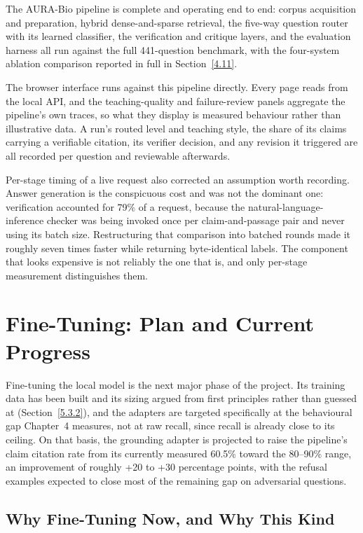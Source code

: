The AURA-Bio pipeline is complete and operating end to end: corpus
acquisition and preparation, hybrid dense-and-sparse retrieval, the
five-way question router with its learned classifier, the verification and
critique layers, and the evaluation harness all run against the full
441-question benchmark, with the four-system ablation comparison reported
in full in Section~\ref{4.11}.

The browser interface runs against this pipeline directly. Every page reads
from the local API, and the teaching-quality and failure-review panels
aggregate the pipeline's own traces, so what they display is measured
behaviour rather than illustrative data. A run's routed level and teaching
style, the share of its claims carrying a verifiable citation, its verifier
decision, and any revision it triggered are all recorded per question and
reviewable afterwards.

Per-stage timing of a live request also corrected an assumption worth
recording. Answer generation is the conspicuous cost and was not the
dominant one: verification accounted for 79\% of a request, because the
natural-language-inference checker was being invoked once per
claim-and-passage pair and never using its batch size. Restructuring that
comparison into batched rounds made it roughly seven times faster while
returning byte-identical labels. The component that looks expensive is not
reliably the one that is, and only per-stage measurement distinguishes them.

\section{Fine-Tuning: Plan and Current Progress}\label{5.3}

Fine-tuning the local model is the next major phase of the project. Its
training data has been built and its sizing argued from first principles
rather than guessed at (Section~\ref{5.3.2}), and the adapters are
targeted specifically at the behavioural gap Chapter~4 measures, not at
raw recall, since recall is already close to its ceiling. On that basis,
the grounding adapter is projected to raise the pipeline's claim citation
rate from its currently measured 60.5\% toward the 80--90\% range, an
improvement of roughly +20 to +30 percentage points, with the refusal
examples expected to close most of the remaining gap on adversarial
questions.

\subsection{Why Fine-Tuning Now, and Why This Kind}\label{5.3.1}

